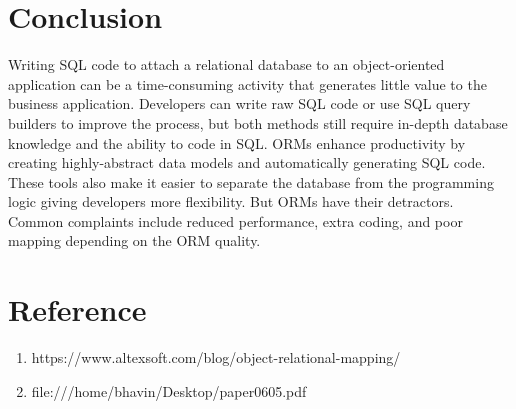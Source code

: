 \documentclass[10pt,a4paper,twoside]{article}
\begin{document}
\section{Conclusion}
Writing SQL code to attach a relational database to an object-oriented application can be a time-consuming activity that generates little value to the business application. Developers can write raw SQL code or use SQL query builders to improve the process, but both methods still require in-depth database knowledge and the ability to code in SQL. ORMs enhance productivity by creating highly-abstract data models and automatically generating SQL code. These tools also make it easier to separate the database from the programming logic giving developers more flexibility. But ORMs have their detractors. Common complaints include reduced performance, extra coding, and poor mapping depending on the ORM quality.


\section{Reference}
\begin{enumerate}
\item https://www.altexsoft.com/blog/object-relational-mapping/
\item file:///home/bhavin/Desktop/paper0605.pdf 
\end{enumerate}
\end{document}
